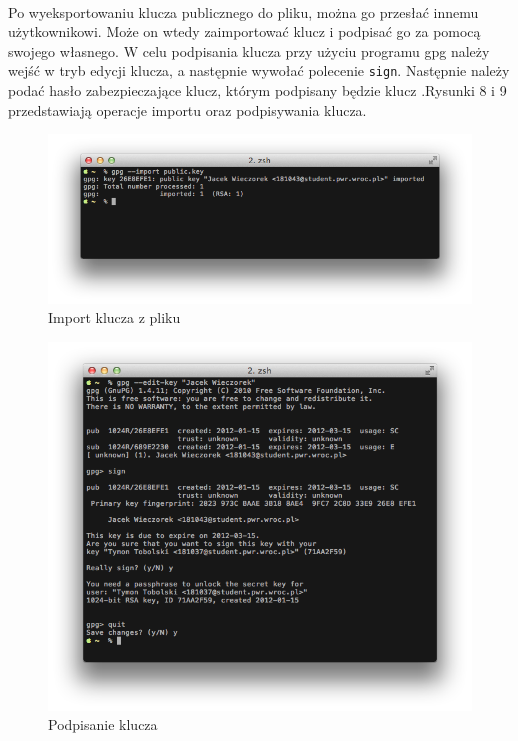 \documentclass[wide,a4paper,titlepage,12pt] {article}
\begin{document}
  \newpage


  \paragraph{}
  Po wyeksportowaniu klucza publicznego do pliku, można go przesłać innemu użytkownikowi. Może on wtedy zaimportować klucz i podpisać go za pomocą swojego własnego. W celu podpisania klucza przy użyciu programu gpg należy wejść w tryb edycji klucza, a następnie wywołać polecenie \texttt{sign}. Następnie należy podać hasło zabezpieczające klucz, którym podpisany będzie klucz .Rysunki 8 i 9 przedstawiają operacje importu oraz podpisywania klucza.

  \begin{figure}[h!]
    \begin{center}
      \includegraphics[width=\textwidth]{img/8.png}
      \caption{Import klucza z pliku}
    \end{center}
  \end{figure}

  \begin{figure}[h!]
    \begin{center}
      \includegraphics[width=\textwidth]{img/9.png}
      \caption{Podpisanie klucza}
    \end{center}
  \end{figure}
\end{document}
